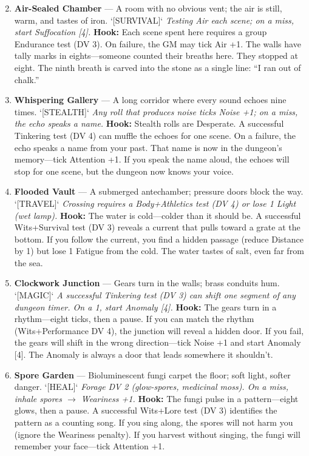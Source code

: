 \begin{enumerate}
\setcounter{enumi}{1}
\item \textbf{Air-Sealed Chamber} --- A room with no obvious vent; the air is still, warm, and tastes of iron. `[SURVIVAL]`
  \hfill \textit{Testing Air each scene; on a miss, start Suffocation [4].}
  \textbf{Hook:} Each scene spent here requires a group Endurance test (DV 3). On failure, the GM may tick Air +1. The walls have tally marks in eights---someone counted their breaths here. They stopped at eight. The ninth breath is carved into the stone as a single line: ``I ran out of chalk.''

\item \textbf{Whispering Gallery} --- A long corridor where every sound echoes nine times. `[STEALTH]`
  \hfill \textit{Any roll that produces noise ticks Noise +1; on a miss, the echo speaks a name.}
  \textbf{Hook:} Stealth rolls are Desperate. A successful Tinkering test (DV 4) can muffle the echoes for one scene. On a failure, the echo speaks a name from your past. That name is now in the dungeon's memory---tick Attention +1. If you speak the name aloud, the echoes will stop for one scene, but the dungeon now knows your voice.

\item \textbf{Flooded Vault} --- A submerged antechamber; pressure doors block the way. `[TRAVEL]`
  \hfill \textit{Crossing requires a Body+Athletics test (DV 4) or lose 1 Light (wet lamp).}
  \textbf{Hook:} The water is cold---colder than it should be. A successful Wits+Survival test (DV 3) reveals a current that pulls toward a grate at the bottom. If you follow the current, you find a hidden passage (reduce Distance by 1) but lose 1 Fatigue from the cold. The water tastes of salt, even far from the sea.

\item \textbf{Clockwork Junction} --- Gears turn in the walls; brass conduits hum. `[MAGIC]`
  \hfill \textit{A successful Tinkering test (DV 3) can shift one segment of any dungeon timer. On a 1, start Anomaly [4].}
  \textbf{Hook:} The gears turn in a rhythm---eight ticks, then a pause. If you can match the rhythm (Wits+Performance DV 4), the junction will reveal a hidden door. If you fail, the gears will shift in the wrong direction---tick Noise +1 and start Anomaly [4]. The Anomaly is always a door that leads somewhere it shouldn't.

\item \textbf{Spore Garden} --- Bioluminescent fungi carpet the floor; soft light, softer danger. `[HEAL]`
  \hfill \textit{Forage DV 2 (glow-spores, medicinal moss). On a miss, inhale spores $\rightarrow$ Weariness +1.}
  \textbf{Hook:} The fungi pulse in a pattern---eight glows, then a pause. A successful Wits+Lore test (DV 3) identifies the pattern as a counting song. If you sing along, the spores will not harm you (ignore the Weariness penalty). If you harvest without singing, the fungi will remember your face---tick Attention +1.


\end{enumerate}
